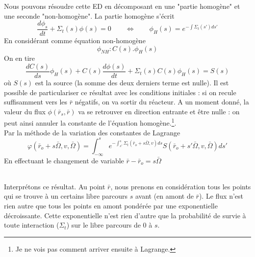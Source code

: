 Nous pouvons résoudre cette ED en décomposant en une "partie homogène" et une seconde "non-homogène". 
La partie homogène s'écrit
\begin{equation}
\dfrac{d\phi_s}{dt}+\Sigma_t(s)\phi(s) = 0\qquad\Leftrightarrow\qquad\phi_H(s) = e^{-\int \Sigma_t(s')ds'}
\end{equation}
En considérant comme équation non-homogène
\begin{equation}
\phi_{NH} : C(s).\phi_H(s)
\end{equation}
On en tire
\begin{equation}
\frac{dC(s)}{ds}\phi_H(s)+C(s)\frac{d\phi(s)}{dt} + \Sigma_t(s)C(s)\phi_H(s) = S(s)
\end{equation}
où $S(s)$ est la source (la somme des deux derniers terme est nulle). Il est possible de 
particulariser ce résultat avec les conditions initiales : si on recule suffisamment vers les 
$\bar r$ négatifs, on va sortir du réacteur. A un moment donné, la valeur du flux 
$\phi(\bar r_s, \bar r)$ va se retrouver en direction entrante et être nulle : on peut ainsi 
annuler la constante de l'équation homogène.\footnote{Je ne vois pas comment arriver ensuite à Lagrange.}. \\

Par la méthode de la variation des constantes de Lagrange
\begin{equation}
\varphi ({\bar r_o} + s\bar \Omega ,v,\bar \Omega ) = \int_{ - \infty }^s {  {e^{ - \int_{s'}^s    {\Sigma _t}({{\bar r}_o} + s\bar \Omega ,v)ds}}} S({\bar r_o} + s'\bar \Omega ,v,\bar \Omega )ds'
\end{equation}
En effectuant le changement de variable $\bar r - {\bar r_o} = s\bar \Omega $

\ \\

Interprétons ce résultat. Au point $\bar r$, nous prenons en considération tous les points qui se 
trouve à un certains libre parcours $s$ avant (en amont de $\bar r$). Le flux n'est rien autre que 
tous les points en amont pondérée par une exponentielle décroissante. Cette exponentielle n'est 
rien d'autre que la probabilité de survie à toute interaction ($\Sigma_t$) sur le libre parcours de 
0 à $s$.\\

